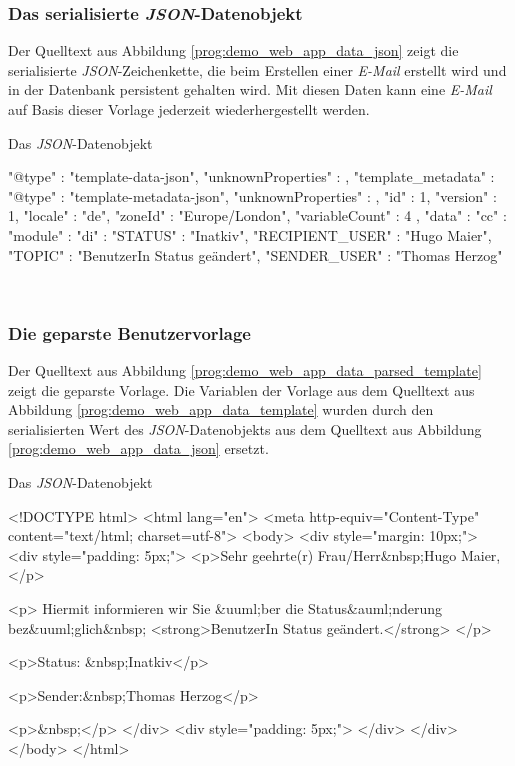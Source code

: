 \subsubsection{Das serialisierte \emph{JSON}-Datenobjekt}
Der Quelltext aus Abbildung \ref{prog:demo_web_app_data_json} zeigt die serialisierte \emph{JSON}-Zeichenkette, die beim Erstellen einer \emph{E-Mail} erstellt wird und in der Datenbank persistent gehalten wird. Mit diesen Daten kann eine \emph{E-Mail} auf Basis dieser Vorlage jederzeit wiederhergestellt werden.

\begin{program}[h]
\caption{Das \emph{JSON}-Datenobjekt}
\label{prog:demo_web_app_data_json}
\begin{JsCode}
{
  "@type" : "template-data-json",
  "unknownProperties" : { },
  "template_metadata" : {
    "@type" : "template-metadata-json",
    "unknownProperties" : { },
    "id" : 1,
    "version" : 1,
    "locale" : "de",
    "zoneId" : "Europe/London",
    "variableCount" : 4
  },
  "data" : {
    "cc" : {
      "module" : {
        "di" : {
          "STATUS" : "Inatkiv",
          "RECIPIENT_USER" : "Hugo Maier",
          "TOPIC" : "BenutzerIn Status geändert",
          "SENDER_USER" : "Thomas Herzog"
        }
      }
    }
  }
}
\end{JsCode}
\end{program}
\ \newpage

\subsubsection{Die geparste Benutzervorlage}
Der Quelltext aus Abbildung \ref{prog:demo_web_app_data_parsed_template} zeigt die geparste Vorlage. Die Variablen der Vorlage aus dem Quelltext aus Abbildung \ref{prog:demo_web_app_data_template} wurden durch den serialisierten Wert des \emph{JSON}-Datenobjekts aus dem Quelltext aus Abbildung \ref{prog:demo_web_app_data_json} ersetzt.

\begin{program}[h]
\caption{Das \emph{JSON}-Datenobjekt}
\label{prog:demo_web_app_data_parsed_template}
\begin{HtmlCode}
<!DOCTYPE html>
<html lang="en">
    <meta http-equiv="Content-Type" content="text/html; charset=utf-8">
<body>
<div style="margin: 10px;">
    <div style="padding: 5px;">
        <p>Sehr geehrte(r) Frau/Herr&nbsp;Hugo Maier,</p>

        <p>
            Hiermit informieren wir Sie &uuml;ber die 
            Status&auml;nderung bez&uuml;glich&nbsp;
            <strong>BenutzerIn Status geändert.</strong>
        </p>

        <p>Status: &nbsp;Inatkiv</p>

        <p>Sender:&nbsp;Thomas Herzog</p>

        <p>&nbsp;</p>
    </div>
    <div style="padding: 5px;">
    </div>
</div>
</body>
</html>
\end{HtmlCode}
\end{program}
\ \newpage

